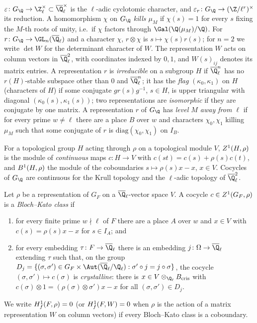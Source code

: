 $\varepsilon\colon G_\Q\to\Z_\ell^\times\subset\katoQlb^\times$ is the $\ell$-adic cyclotomic character, and
$\varepsilon_r\colon G_\Q\to(\Z/\ell^r)^\times$ its reduction. A homomorphism $\chi$ on $G_\Q$ \emph{kills
$\mu_M$} if $\chi(s)=1$ for every $s$ fixing the $M$-th roots of unity, i.e.\ if $\chi$ factors through
$\Gal(\Q(\mu_M)/\Q)$. For $r\colon G_\Q\to\GL_n(\katoQlb)$ and a character $\chi$, $r\otimes\chi$ is
$s\mapsto\chi(s)r(s)$; for $n=2$ we write $\det W$ for the determinant character of $W$. The representation $W$
acts on column vectors in $\katoQlb^2$, with coordinates indexed by $0,1$, and $W(s)_{ij}$ denotes its matrix
entries. A representation $r$ is \emph{irreducible} on a subgroup $H$ if $\katoQlb^n$ has no $r(H)$-stable
subspace other than $0$ and $\katoQlb^n$; it has the \emph{flag} $(\kappa_0,\kappa_1)$ on $H$ (characters of $H$)
if some conjugate $gr(s)g^{-1}$, $s\in H$, is upper triangular with diagonal $(\kappa_0(s),\kappa_1(s))$; two
representations are \emph{isomorphic} if they are conjugate by one matrix. A representation $r$ of $G_\Q$ has
\emph{level $M$ away from $\ell$} if for every prime $w\ne\ell$ there are a place $B$ over $w$ and characters
$\chi_0,\chi_1$ killing $\mu_M$ such that some conjugate of $r$ is $\mathrm{diag}(\chi_0,\chi_1)$ on $I_B$.

For a topological group $H$ acting through $\rho$ on a topological module $V$, $Z^1(H,\rho)$ is the module of
\emph{continuous} maps $c\colon H\to V$ with $c(st)=c(s)+\rho(s)c(t)$, and $B^1(H,\rho)$ the module of the
coboundaries $s\mapsto\rho(s)x-x$, $x\in V$. Cocycles of $G_\Q$ are continuous for the Krull topology and the
$\ell$-adic topology of $\katoQlb^2$.

\begin{definition}\label{pf:kato:def:bk}
Let $\rho$ be a representation of $G_F$ on a $\katoQlb$-vector space $V$. A cocycle $c\in Z^1(G_F,\rho)$ is a
\emph{Bloch--Kato class} if
\begin{enumerate}[label=(\roman*)]
\item for every finite prime $w\nmid\ell$ of $F$ there are a place $A$ over $w$ and $x\in V$ with
  $c(s)=\rho(s)x-x$ for $s\in I_A$; and
\item for every embedding $\tau\colon F\to\katoQlb$ there is an embedding $j\colon\Omega\to\katoQlb$ extending
  $\tau$ such that, on the group $D_j=\{(\sigma,\sigma')\in G_F\times\Aut(\katoQlb/\Q_\ell):\sigma'\circ j=j\circ\sigma\}$,
  the cocycle $(\sigma,\sigma')\mapsto c(\sigma)$ is \emph{crystalline}: there is $x\in V\otimes_{\Q_\ell}B_{\mathrm{cris}}$
  with $c(\sigma)\otimes1=(\rho(\sigma)\otimes\sigma')x-x$ for all $(\sigma,\sigma')\in D_j$.
\end{enumerate}
We write $H^1_{f}(F,\rho)=0$ (or $H^1_{f}(F,W)=0$ when $\rho$ is the action of a matrix representation $W$ on
column vectors) if every Bloch--Kato class is a coboundary.
\end{definition}

